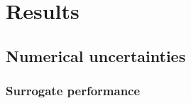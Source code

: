 \documentclass[12pt,number,preprint,review,times]{elsarticle}
\begin{document}


\section{Results}

\subsection{Numerical uncertainties}

\subsubsection{Surrogate performance}





\end{document}
